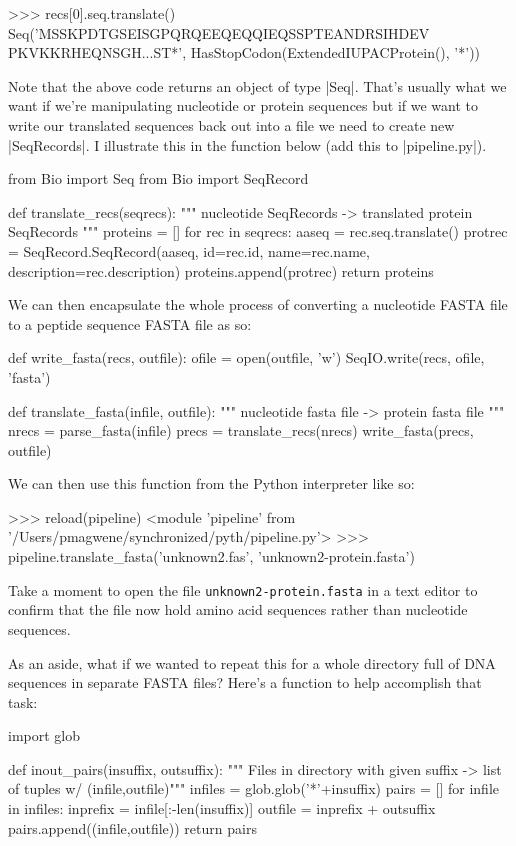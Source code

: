 \documentclass[10pt,letterpaper]{scrartcl}
\begin{document}
\begin{python}
>>> recs[0].seq.translate()
Seq('MSSKPDTGSEISGPQRQEEQEQQIEQSSPTEANDRSIHDEV
PKVKKRHEQNSGH...ST*', HasStopCodon(ExtendedIUPACProtein(), '*'))
\end{python}

Note that the above code returns an object of type |Seq|. That's usually what we want if we're manipulating nucleotide or protein sequences but if we want to write our translated sequences back out into a file we need to create new |SeqRecords|. I illustrate this in the function below (add this to |pipeline.py|).

\begin{python}
from Bio import Seq
from Bio import SeqRecord

def translate_recs(seqrecs):
    """ nucleotide SeqRecords -> translated protein SeqRecords """ 
    proteins = []
    for rec in seqrecs:
        aaseq = rec.seq.translate()
        protrec = SeqRecord.SeqRecord(aaseq, id=rec.id, name=rec.name, 
        			      description=rec.description)
        proteins.append(protrec)
    return proteins
\end{python}    

We can then encapsulate the whole process of converting a nucleotide FASTA file to a peptide sequence FASTA file as so:

\begin{python}
def write_fasta(recs, outfile):
    ofile = open(outfile, 'w')
    SeqIO.write(recs, ofile, 'fasta')

def translate_fasta(infile, outfile):
    """ nucleotide fasta file -> protein fasta file """
    nrecs = parse_fasta(infile)
    precs = translate_recs(nrecs)
    write_fasta(precs, outfile)
\end{python}

We can then use this function from the Python interpreter like so:

\begin{python}
>>> reload(pipeline)
<module 'pipeline' from '/Users/pmagwene/synchronized/pyth/pipeline.py'>
>>> pipeline.translate_fasta('unknown2.fas', 'unknown2-protein.fasta')
\end{python}

Take a moment to open the file \texttt{unknown2-protein.fasta} in a text editor to confirm that the file now hold amino acid sequences rather than nucleotide sequences.

As an aside, what if we wanted to repeat this for a whole directory full of DNA sequences in separate FASTA files?  Here's a function to help accomplish that task:
\begin{python}
import glob

def inout_pairs(insuffix, outsuffix):
    """ Files in directory with given suffix -> list of tuples w/ (infile,outfile)"""
    infiles = glob.glob('*'+insuffix)
    pairs = []
    for infile in infiles:
        inprefix = infile[:-len(insuffix)]
        outfile = inprefix + outsuffix
        pairs.append((infile,outfile))
    return pairs                                                    
\end{python}
\end{document}
